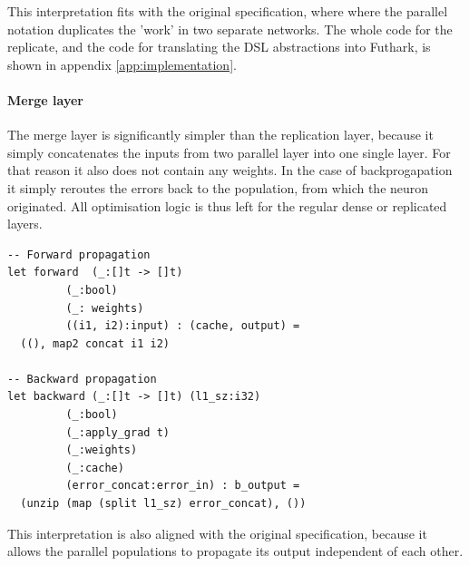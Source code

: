 This interpretation fits with the original specification, where
where the parallel notation duplicates the 'work' in two separate 
networks.
The whole code for the replicate, and the code for translating the \gls{DSL}
abstractions into Futhark,  is shown in appendix 
\ref{app:implementation}.

\paragraph{Merge layer}
The merge layer is significantly simpler than the replication layer,
because it simply concatenates the inputs from two parallel layer into one single
layer. 
For that reason it also does not contain any weights.
In the case of backprogapation it simply reroutes the errors back to
the population, from which the neuron originated.
All optimisation logic is thus left for the regular dense or replicated
layers.

\lstset{language=,caption=Functions for forward and backward propagation in the merge layer.}
\begin{lstlisting}
-- Forward propagation
let forward  (_:[]t -> []t)
	     (_:bool)
	     (_: weights)
	     ((i1, i2):input) : (cache, output) =
  ((), map2 concat i1 i2)

-- Backward propagation
let backward (_:[]t -> []t) (l1_sz:i32)
	     (_:bool)
	     (_:apply_grad t)
	     (_:weights)
	     (_:cache)
	     (error_concat:error_in) : b_output =
  (unzip (map (split l1_sz) error_concat), ())
\end{lstlisting}

This interpretation is also aligned with the original specification, 
because it allows the parallel populations to propagate its output
independent of each other.

